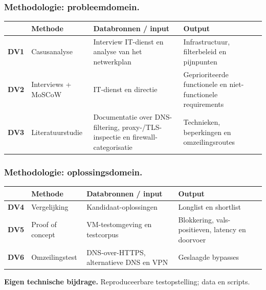 \documentclass[aspectratio=169]{beamer}
\begin{document}
\begin{frame}
    \frametitle{Methodologie: probleemdomein.}

    \footnotesize
    \begin{table}
        \renewcommand{\arraystretch}{1.4}
        \begin{tabular}{@{}lp{2.7cm}p{4cm}p{3.3cm}@{}}
            \toprule
            & \textbf{Methode} & \textbf{Databronnen / input} &
            \textbf{Output} \\
            \midrule
            \textbf{DV1} & Casusanalyse &
            Interview IT-dienst en analyse van het netwerkplan &
            Infrastructuur, filterbeleid en pijnpunten \\
            \midrule
            \textbf{DV2} & Interviews + MoSCoW &
            IT-dienst en directie &
            Geprioriteerde functionele en niet-functionele requirements \\
            \midrule
            \textbf{DV3} & Literatuurstudie &
            Documentatie over DNS-filtering, proxy-/TLS-inspectie en
            firewall-categorisatie &
            Technieken, beperkingen en omzeilingsroutes \\
            \bottomrule
        \end{tabular}
    \end{table}
\end{frame}

\begin{frame}
    \frametitle{Methodologie: oplossingsdomein.}

    \footnotesize
    \begin{table}
        \renewcommand{\arraystretch}{1.4}
        \begin{tabular}{@{}lp{2.7cm}p{4cm}p{3.3cm}@{}}
            \toprule
            & \textbf{Methode} & \textbf{Databronnen / input} &
            \textbf{Output} \\
            \midrule
            \textbf{DV4} & Vergelijking &
            Kandidaat-oplossingen &
            Longlist en shortlist \\
            \midrule
            \textbf{DV5} & Proof of concept &
            VM-testomgeving en testcorpus &
            Blokkering, vals-positieven, latency en doorvoer \\
            \midrule
            \textbf{DV6} & Omzeilingstest &
            DNS-over-HTTPS, alternatieve DNS en VPN &
            Geslaagde bypasses \\
            \bottomrule
        \end{tabular}
    \end{table}

    \bigskip

    \textcolor{hggrey}{\textbf{Eigen technische bijdrage.}}
    Reproduceerbare testopstelling; data en scripts.
\end{frame}
\end{document}
